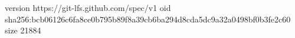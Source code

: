 version https://git-lfs.github.com/spec/v1
oid sha256:bcb06126c6fa8ce0b795b89f8a39cb6ba294d8cda5dc9a32a0498bf0b3fe2c60
size 21884
